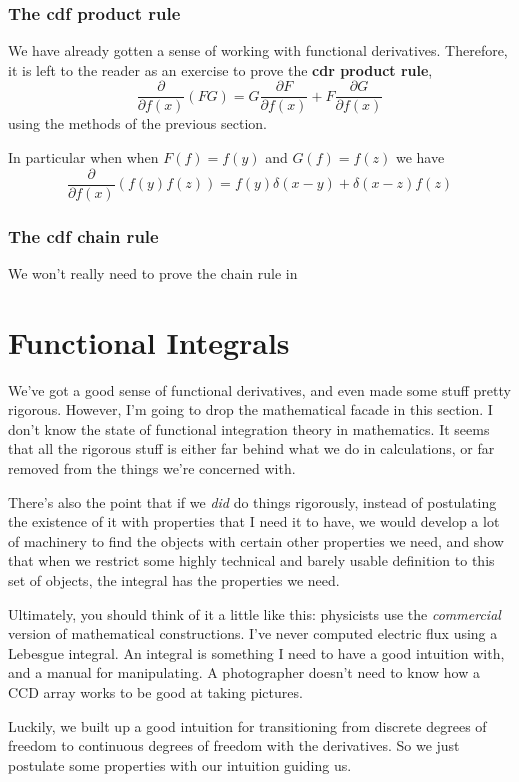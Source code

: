 \documentclass{book}
\begin{document}
\subsubsection{The cdf product rule}
We have already gotten a sense of working with functional derivatives. Therefore, it is left to the reader as an exercise to prove the \textbf{cdr product rule},
\begin{equation} \label{cdfprod}
\boxed{\frac{\partial}{\partial f(x)} \left( FG \right) = G \frac{\partial F}{\partial f(x)} + F \frac{\partial G}{\partial f(x)}} 
\end{equation}
using the methods of the previous section. 

In particular when when $F(f) = f(y)$ and $G(f) = f(z)$ we have
\[
\frac{\partial}{\partial f(x)} \left( f(y) f(z) \right) = f(y) \delta(x - y) + \delta(x - z) f(z)
\]
\subsubsection{The cdf chain rule}
We won't really need to prove the chain rule in 
\section{Functional Integrals}
We've got a good sense of functional derivatives, and even made some stuff pretty rigorous. However, I'm going to drop the mathematical facade in this section. I don't know the state of functional integration theory in mathematics. It seems that all the rigorous stuff is either far behind what we do in calculations, or far removed from the things we're concerned with.

There's also the point that if we \textit{did} do things rigorously, instead of postulating the existence of it with properties that I need it to have, we would develop a lot of machinery to find the objects with certain other properties we need, and show that when we restrict some highly technical and barely usable definition to this set of objects, the integral has the properties we need. 

Ultimately, you should think of it a little like this: physicists use the \textit{commercial} version of mathematical constructions. I've never computed electric flux using a Lebesgue integral. An integral is something I need to have a good intuition with, and a manual for manipulating. A photographer doesn't need to know how a CCD array works to be good at taking pictures. 

Luckily, we built up a good intuition for transitioning from discrete degrees of freedom to continuous degrees of freedom with the derivatives. So we just postulate some properties with our intuition guiding us.
\end{document}

